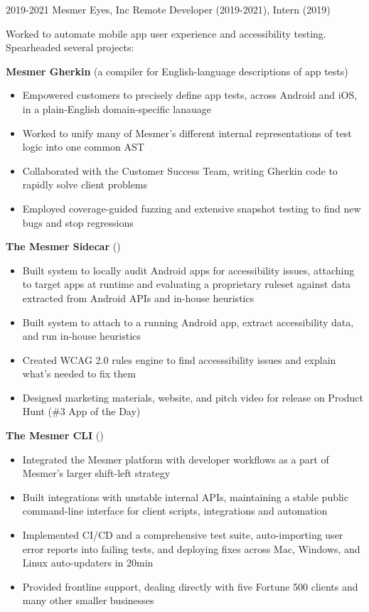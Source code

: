 \documentclass[letterpaper,10pt]{article}
\begin{document}
\work
{2019-2021}
{Mesmer Eyes, Inc}
{Remote}
{Developer (2019-2021), Intern (2019)}
{
	Worked to automate mobile app user experience and accessibility testing. Spearheaded several projects:

	\vbeat
	\textbf{Mesmer Gherkin} (a compiler for English-language descriptions of app tests)

	\begin{itemize}
	\item Empowered customers to precisely define app tests, across Android and iOS, in a plain-English domain-specific lanauage
	\item Worked to unify many of Mesmer's different internal representations of test logic into one common AST
	\item Collaborated with the Customer Success Team, writing Gherkin code to rapidly solve client problems
	\item Employed coverage-guided fuzzing and extensive snapshot testing to find new bugs and stop regressions
	\end{itemize}

	\textbf{The Mesmer Sidecar} ()

	\begin{itemize}
	\item Built system to locally audit Android apps for accessibility issues, attaching to target apps at runtime and evaluating a proprietary ruleset against data extracted from Android APIs and in-house heuristics
	\item Built system to attach to a running Android app, extract accessibility data, and run in-house heuristics
	\item Created WCAG 2.0 rules engine to find accesssibility issues and explain what's needed to fix them
	\item Designed marketing materials, website, and pitch video for release on Product Hunt (\#3 App of the Day)
	\end{itemize}

	\textbf{The Mesmer CLI} ()

	\begin{itemize}
	\item Integrated the Mesmer platform with developer workflows as a part of Mesmer's larger shift-left strategy
	\item Built integrations with unstable internal APIs, maintaining a stable public command-line interface for client scripts, integrations and automation
	\item Implemented CI/CD and a comprehensive test suite, auto-importing user error reports into failing tests, and deploying fixes across Mac, Windows, and Linux auto-updaters in 20min
	\item Provided frontline support, dealing directly with five Fortune 500 clients and many other smaller businesses
	\end{itemize}
}
\end{document}
